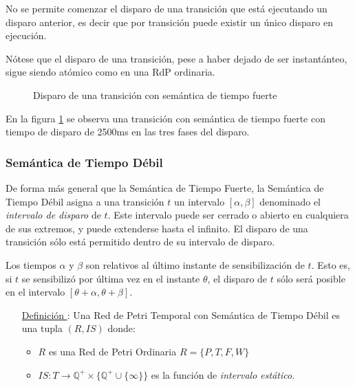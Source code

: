 No se permite comenzar el disparo de una transición que está ejecutando un
disparo anterior, es decir que por transición puede existir un único disparo en
ejecución.

Nótese que el disparo de una transición, pese a haber dejado de ser
instantánteo, sigue siendo atómico como en una RdP ordinaria.

\begin{figure}[h]
  \centering
  \caption{Disparo de una transición con semántica de tiempo fuerte}
  \label{fig:disparo_tiempo_fuerte}
\end{figure}

En la figura \ref{fig:disparo_tiempo_fuerte} se observa una transición con
semántica de tiempo fuerte con tiempo de disparo de 2500ms en las tres fases del
disparo.

\subsubsection{Semántica de Tiempo Débil}

De forma más general que la Semántica de Tiempo Fuerte, la Semántica de
Tiempo Débil asigna a una transición $t$ un intervalo $[\alpha, \beta]$
denominado el \textit{intervalo de disparo} de $t$. Este intervalo puede ser cerrado o
abierto en cualquiera de sus extremos, y puede extenderse hasta el infinito. El
disparo de una transición sólo está permitido dentro de su intervalo de disparo.

Los tiempos $\alpha$ y $\beta$ son relativos al último instante de
sensibilización de $t$.
Esto es, si $t$ se sensibilizó por última vez en el instante $\theta$, el
disparo de $t$ sólo será posible en el intervalo $[\theta + \alpha, \theta
+ \beta]$. \cite{PetriNetsFundamentals}

\begin{itemize}
  \item [\underline{Definición \thedefinitionsCounter}:] Una Red de Petri Temporal con Semántica de
  Tiempo Débil es una tupla $(R, IS)$ donde:
  \begin{itemize}
    \item $R$ es una Red de Petri Ordinaria $R = \{P, T, F, W \}$
    \item $IS: T \rightarrow \mathbb{Q^{+}} \times \{ \mathbb{Q^{+}} \cup \{
    \infty \} \}$ es la función de \textit{intervalo estático}.
  \end{itemize}
\end{itemize}

